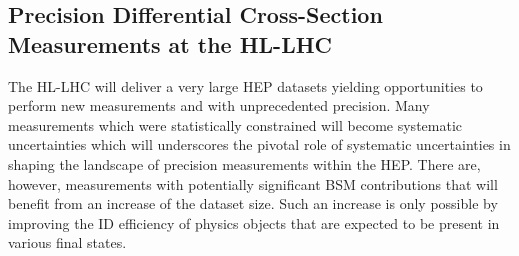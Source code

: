 \documentclass[letter, USenglish, 11pt, subfigure]{article}
\begin{document}
\subsection{Precision Differential Cross-Section Measurements at the HL-LHC}
The HL-LHC will deliver a very large HEP datasets yielding opportunities to perform new measurements and with unprecedented precision.
Many measurements which were statistically constrained will become systematic uncertainties which will underscores the pivotal role of systematic uncertainties in shaping the landscape of precision measurements within the HEP. There are, however, measurements with potentially significant BSM contributions that will benefit from an increase of the dataset size. Such an increase is only possible by improving the ID efficiency of physics objects that are expected to be present in various final states. 
\end{document}
